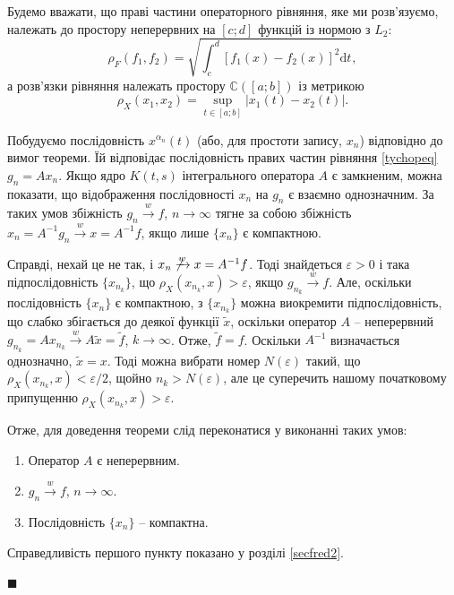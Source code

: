 \documentclass[14pt,twoside]{extreport}
\theoremstyle{mystyle}
\renewenvironment{proof}{{\bfseries Доведення.}}{$\blacksquare$}
\numberwithin{equation}{chapter}
\newcommand{\cab}{\mathbb{C}([a; b])}
\begin{document}
\begin{proof}
Будемо вважати, що праві частини операторного рівняння, яке ми розв'язуємо, належать до простору неперервних на $[c; d]$ функцій із нормою з $L_2$:
$$
\rho_{F}(f_{1}, f_{2})=\sqrt{\int_{c}^{d}[f_{1}(x)-f_{2}(x)]^{2}\mathrm{d}t},
$$
а розв'язки рівняння належать простору $\cab$ із метрикою
$$
\rho_{X}(x_{1}, x_{2})=\sup\limits_{t \in [a; b]}|x_{1}(t)-x_{2}(t)|.
$$

Побудуємо послідовність $x^{\alpha_n}(t)$ (або, для простоти запису, $x_n$) відповідно до вимог теореми. Їй відповідає послідовність правих частин рівняння \eqref{tychopeq} $g_n = Ax_n$. Якщо ядро $K(t, s)$ інтегрального оператора $A$ є замкненим, можна показати, що відображення послідовності $x_n$ на $g_n$ є взаємно однозначним. За таких умов збіжність $g_n \xrightarrow{w} f$, $n \to \infty$ тягне за собою збіжність $x_n = A^{-1} g_n \xrightarrow{w} x= A^{-1} f$, якщо лише $\{x_n\}$ є компактною.

Справді, нехай це не так, і $x_n \not\xrightarrow{w} x =A^{-1} f$. Тоді знайдеться $\varepsilon > 0$ і така підпослідовність $\{x_{n_k}\}$, що $\rho_{X}(x_{n_k}, x) > \varepsilon$, якщо $g_{n_k} \xrightarrow{w} f$. Але, оскільки послідовність $\{x_n\}$ є компактною, з $\{x_{n_k}\}$ можна виокремити підпослідовність, що слабко збігається до деякої функції $\tilde{x}$, оскільки оператор $A$ -- неперервний $g_{n_k} = Ax_{n_k} \xrightarrow{w} A\tilde{x} = \tilde{f}$, $k \to \infty$. Отже, $\tilde{f} = f$. Оскільки $A^{-1}$ визначається однозначно, $\tilde{x} = x$. Тоді можна вибрати номер $N(\varepsilon)$ такий, що $\rho_{X}(x_{n_k}, x) < \varepsilon/2$, щойно $n_k >N(\varepsilon)$, але це суперечить нашому початковому припущенню $\rho_{X}(x_{n_k}, x) > \varepsilon$.

Отже, для доведення теореми слід переконатися у виконанні таких умов:

\begin{enumerate}
 \item Оператор $A$ є неперервним.
 \item $g_n \xrightarrow{w} f$, $n\to \infty$.
 \item Послідовність $\{x_n\}$ -- компактна.
\end{enumerate}

Справедливість першого пункту показано у розділі \ref{secfred2}.


\end{proof}
\end{document}
